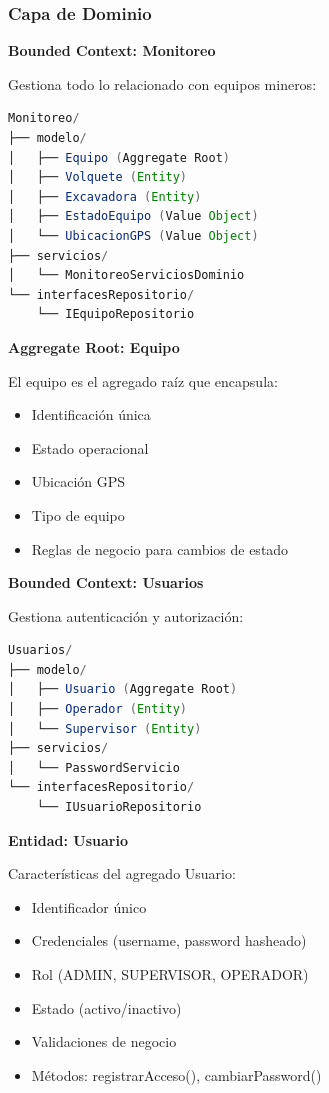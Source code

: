 \documentclass[12pt,a4paper]{article}
\begin{document}
\subsubsection{Capa de Dominio}

\textbf{Bounded Context: Monitoreo}

Gestiona todo lo relacionado con equipos mineros:

\begin{lstlisting}[language=Java, caption=Estructura del contexto Monitoreo]
Monitoreo/
├── modelo/
│   ├── Equipo (Aggregate Root)
│   ├── Volquete (Entity)
│   ├── Excavadora (Entity)
│   ├── EstadoEquipo (Value Object)
│   └── UbicacionGPS (Value Object)
├── servicios/
│   └── MonitoreoServiciosDominio
└── interfacesRepositorio/
    └── IEquipoRepositorio
\end{lstlisting}

\textbf{Aggregate Root: Equipo}

El equipo es el agregado raíz que encapsula:
\begin{itemize}
    \item Identificación única
    \item Estado operacional
    \item Ubicación GPS
    \item Tipo de equipo
    \item Reglas de negocio para cambios de estado
\end{itemize}

\textbf{Bounded Context: Usuarios}

Gestiona autenticación y autorización:

\begin{lstlisting}[language=Java, caption=Estructura del contexto Usuarios]
Usuarios/
├── modelo/
│   ├── Usuario (Aggregate Root)
│   ├── Operador (Entity)
│   └── Supervisor (Entity)
├── servicios/
│   └── PasswordServicio
└── interfacesRepositorio/
    └── IUsuarioRepositorio
\end{lstlisting}

\textbf{Entidad: Usuario}

Características del agregado Usuario:
\begin{itemize}
    \item Identificador único
    \item Credenciales (username, password hasheado)
    \item Rol (ADMIN, SUPERVISOR, OPERADOR)
    \item Estado (activo/inactivo)
    \item Validaciones de negocio
    \item Métodos: registrarAcceso(), cambiarPassword()
\end{itemize}
\end{document}
